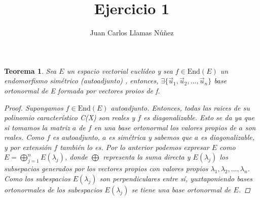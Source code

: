 \documentclass[12pt, a4paper]{article}
\newtheorem{teoremaEspectral}{Teorema}
\begin{document}
    \title{Ejercicio 1}
    \author{Juan Carlos Llamas Núñez}
    \maketitle
  
    \begin{teoremaEspectral}
    Sea $E$ un espacio vectorial euclídeo y sea $f \in \textrm{End}(E)$ un endomorfismo simétrico (autoadjunto) , entonces, $\exists \{\vec{u}_1,\vec{u}_2,...,\vec{u}_n\}$ base ortonormal de E formada por vectores proios de f.
        
       
        \begin{proof}
        Supongamos  $f \in \textrm{End}(E)$ autoadjunto. Entonces, todas las raices de su polinomio característico C(X) son reales y $f$ es diagonalizable. Esto se da ya que si tomamos la matriz $a$ de $f$ en una base ortonormal los valores propios de $a$ son reales. Como $f$ es autoadjunto, $a$ es simétrica y sabemos que $a$ es diagonalizable, y por extensión $f$ también lo es. Por lo anterior podemos expresar $E$ como $E=\bigoplus^{n}_{j=1} E(\lambda_{j})$, donde $\bigoplus$ representa la suma directa y $E(\lambda_{j})$ los subsepacios generados por los vectores propios con valores propios $\lambda_{1}, \lambda_{2},...,\lambda_{n}$. Como los subespacios  $E(\lambda_{j})$ son perpendiculares entre sí, yuxtaponiendo bases ortonormales de los subespacios $E(\lambda_{j})$ se tiene una base ortonormal de $E$. 
        \end{proof}

    \end{teoremaEspectral}
    
    
    
\end{document}
